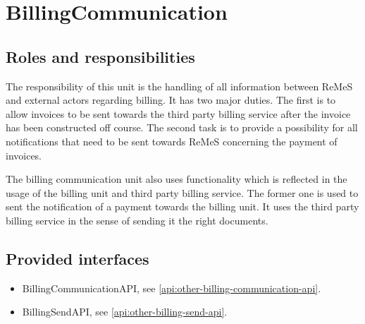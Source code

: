 \section{BillingCommunication}
\label{element:billing-communication}

\subsection{Roles and responsibilities}

\npar The responsibility of this unit is the handling of all information between
ReMeS and external actors regarding billing. It has two major duties. The first
is to allow invoices to be sent towards the third party billing service after
the invoice has been constructed off course. The second task is to provide a
possibility for all notifications that need to be sent towards ReMeS concerning
the payment of invoices.

\npar The billing communication unit also uses functionality which is reflected
in the usage of the billing unit and third party billing service. The former one
is used to sent the notification of a payment towards the billing unit. It uses
the third party billing service in the sense of sending it the right documents.

\subsection{Provided interfaces}

\begin{itemize}
  \item BillingCommunicationAPI, see \ref{api:other-billing-communication-api}.
  \item BillingSendAPI, see \ref{api:other-billing-send-api}.
\end{itemize}
